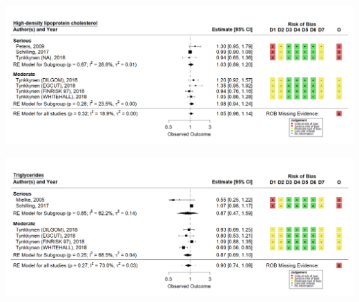 \documentclass[a4paper, twoside]{templates/ociamthesis}
\begin{document}
\includegraphics[width=1\linewidth]{figures/sys-rev/fp_obs_Dementia_HDL_}

\includegraphics[width=1\linewidth]{figures/sys-rev/fp_obs_Dementia_TG_}
\end{document}
